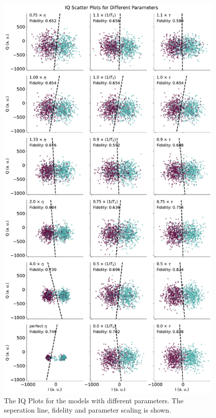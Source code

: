 \begin{figure}
    \centering
    \includegraphics{Simulations/budgets/figures/iq_scatter_budgetting.pdf}
    \caption{The IQ Plots for the models  with different parameters. The seperation line, fidelity and parameter scaling is shown.}
    \label{fig:budgetting_IQ_plots}
\end{figure}
\FloatBarrier

